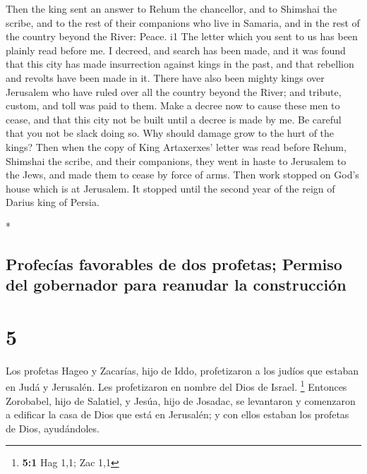 \begin{paracol}{2}
\begin{otherlanguage}{english}
 Then the king sent an answer to Rehum the chancellor,
and to Shimshai the scribe, and to the rest of their companions who live
in Samaria, and in the rest of the country beyond the River: Peace. i1
 The letter which you sent to us has been plainly read
before me.  I decreed, and search has been made, and it
was found that this city has made insurrection against kings in the
past, and that rebellion and revolts have been made in it.
 There have also been mighty kings over Jerusalem who
have ruled over all the country beyond the River; and tribute, custom,
and toll was paid to them.  Make a decree now to cause
these men to cease, and that this city not be built until a decree is
made by me.  Be careful that you not be slack doing so.
Why should damage grow to the hurt of the kings?  Then
when the copy of King Artaxerxes' letter was read before Rehum, Shimshai
the scribe, and their companions, they went in haste to Jerusalem to the
Jews, and made them to cease by force of arms.  Then work
stopped on God's house which is at Jerusalem. It stopped until the
second year of the reign of Darius king of Persia.

\end{otherlanguage}

\switchcolumn[0]*

\hypertarget{profecuxedas-favorables-de-dos-profetas-permiso-del-gobernador-para-reanudar-la-construcciuxf3n}{%
\subsection{Profecías favorables de dos profetas; Permiso del gobernador
para reanudar la
construcción}\label{profecuxedas-favorables-de-dos-profetas-permiso-del-gobernador-para-reanudar-la-construcciuxf3n}}

\hypertarget{section-8}{%
\section{5}\label{section-8}}

 Los profetas Hageo y Zacarías, hijo de Iddo, profetizaron
a los judíos que estaban en Judá y Jerusalén. Les profetizaron en nombre
del Dios de Israel. \footnote{\textbf{5:1} Hag 1,1; Zac 1,1}
 Entonces Zorobabel, hijo de Salatiel, y Jesúa, hijo de
Josadac, se levantaron y comenzaron a edificar la casa de Dios que está
en Jerusalén; y con ellos estaban los profetas de Dios, ayudándoles.


\end{paracol}

